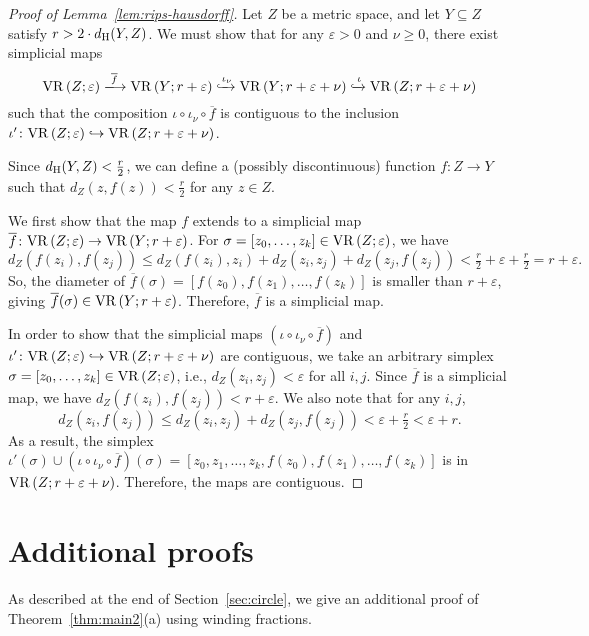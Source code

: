 \documentclass[11pt, reqno, english]{amsart}
\newcommand{\of}{\overline{f}}
\begin{document}
\begin{proof}[Proof of Lemma~\ref{lem:rips-hausdorff}]
Let $Z$ be a metric space, and let $Y\subseteq Z$ satisfy $r > 2\cdot d_{\mathrm{H}}(Y,Z)$.
We must show that for any $\varepsilon > 0$ and $\nu \ge 0$, there exist simplicial maps
\[\vr{Z}{\varepsilon} \xlongrightarrow{\of} \vr{Y}{r+\varepsilon} \xhookrightarrow{\iota_\nu} \vr{Y}{r+\varepsilon+\nu}
\xhookrightarrow{\iota} \vr{Z}{r+\varepsilon+\nu}\]
such that the composition $\iota \circ \iota_\nu \circ \of$ is contiguous to the inclusion $\iota'\colon \mathrm{VR}\left(Z;\varepsilon\right)\hookrightarrow\mathrm{VR}\left(Z;r+\varepsilon+\nu\right)$.

Since $d_{\mathrm{H}}(Y,Z)<\frac{r}{2}$, we can define a (possibly discontinuous) function $f\colon Z\to Y$ such that $d_Z(z,f(z))<\frac{r}{2}$ for any $z\in Z$.

We first show that the map $f$ extends to a simplicial map
$\of\colon \vr{Z}{\varepsilon}\to \vr{Y}{r+\varepsilon}$.
For $\sigma=[z_0,\ldots,z_k]\in\mathrm{VR}\left(Z;\varepsilon\right)$, we have
\[
d_Z(f(z_i), f(z_j))\leq d_Z(f(z_i),z_i)+d_Z(z_i,z_j)+d_Z(z_j,f(z_j)) < \tfrac{r}{2}+\varepsilon+\tfrac{r}{2}=r+\varepsilon.
\]
So, the diameter of $\of(\sigma)=[f(z_0),f(z_1),\ldots,f(z_k)]$ is smaller than $r+\varepsilon$, giving $\of(\sigma)\in\vr{Y}{r+\varepsilon}$.
Therefore, $\of$ is a simplicial map.

In order to show that the simplicial maps $(\iota \circ \iota_\nu \circ \of)$ and $\iota'\colon \mathrm{VR}\left(Z;\varepsilon\right)\hookrightarrow\mathrm{VR}\left(Z;r+\varepsilon+\nu\right)$ are contiguous, we take an arbitrary simplex $\sigma=[z_0,\ldots,z_k]\in\mathrm{VR}\left(Z;\varepsilon\right)$, i.e., $d_Z(z_i,z_j) < \varepsilon$ for all $i,j$.
Since $\of$ is a simplicial map, we have $d_Z(f(z_i),f(z_j)) < r+\varepsilon$.
We also note that for any $i,j$,
\[
d_Z(z_i,f(z_j))
\leq d_Z(z_i,z_j)+d_Z(z_j,f(z_j)) 
< \varepsilon + \tfrac{r}{2} < \varepsilon+r.
\]
As a result, the simplex 
$\iota'(\sigma)\cup (\iota\circ\iota_\nu\circ\of)(\sigma)=[z_0,z_1,\ldots,z_k,f(z_0),f(z_1),\ldots,f(z_k)] $
is in $\mathrm{VR}\left(Z;r+\varepsilon+\nu\right)$.
Therefore, the maps are contiguous.
\end{proof}



\section{Additional proofs}
\label{app:additional}

As described at the end of Section~\ref{sec:circle}, we give an additional proof of Theorem~\ref{thm:main2}(a) using winding fractions.
\end{document}
